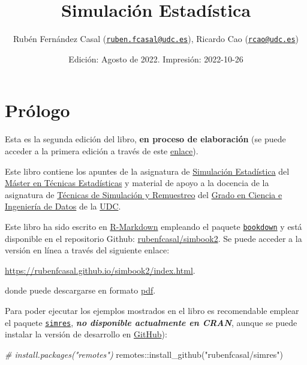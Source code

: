 \documentclass[
]{book}
\title{Simulación Estadística}
\author{Rubén Fernández Casal (\href{mailto:ruben.fcasal@udc.es}{\nolinkurl{ruben.fcasal@udc.es}}), Ricardo Cao (\href{mailto:rcao@udc.es}{\nolinkurl{rcao@udc.es}})}
\date{Edición: Agosto de 2022. Impresión: 2022-10-26}
\newenvironment{Shaded}{\begin{snugshade}}{\end{snugshade}}
\newcommand{\CommentTok}[1]{\textcolor[rgb]{0.56,0.35,0.01}{\textit{#1}}}
\newcommand{\FunctionTok}[1]{\textcolor[rgb]{0.00,0.00,0.00}{#1}}
\newcommand{\NormalTok}[1]{#1}
\newcommand{\SpecialCharTok}[1]{\textcolor[rgb]{0.00,0.00,0.00}{#1}}
\newcommand{\StringTok}[1]{\textcolor[rgb]{0.31,0.60,0.02}{#1}}
\theoremstyle{break}
\theoremstyle{nonumberplain}
\begin{document}
\maketitle

{
\setcounter{tocdepth}{1}
\tableofcontents
}
\hypertarget{pruxf3logo}{%
\chapter*{Prólogo}\label{pruxf3logo}}

Esta es la segunda edición del libro, \textbf{en proceso de elaboración} (se puede acceder a la primera edición a través de este \href{https://rubenfcasal.github.io/simbook/index.html}{enlace}).

Este libro contiene los apuntes de la asignatura de \href{http://eamo.usc.es/pub/mte/index.php/es/?option=com_content\&view=article\&id=2201\&idm=13\&a\%C3\%B1o=2019}{Simulación Estadística} del \href{http://eio.usc.es/pub/mte}{Máster en Técnicas Estadísticas} y material de apoyo a la docencia de la asignatura de \href{https://guiadocente.udc.es/guia_docent/index.php?centre=614\&ensenyament=614G02\&assignatura=614G02036\&idioma=cast}{Técnicas de Simulación y Remuestreo} del \href{https://estudos.udc.es/es/study/start/614G02V01}{Grado en Ciencia e Ingeniería de Datos} de la \href{https://www.udc.es}{UDC}.

Este libro ha sido escrito en \href{http://rmarkdown.rstudio.com}{R-Markdown} empleando el paquete \href{https://bookdown.org/yihui/bookdown/}{\texttt{bookdown}} y está disponible en el repositorio Github: \href{https://github.com/rubenfcasal/simbook2}{rubenfcasal/simbook2}.
Se puede acceder a la versión en línea a través del siguiente enlace:

\url{https://rubenfcasal.github.io/simbook2/index.html}.

donde puede descargarse en formato \href{https://rubenfcasal.github.io/simbook2/Simulacion.pdf}{pdf}.

Para poder ejecutar los ejemplos mostrados en el libro es recomendable emplear el paquete \href{https://rubenfcasal.github.io/simres}{\texttt{simres}}, \textbf{\emph{no disponible actualmente en CRAN}}, aunque se puede instalar la versión de desarrollo en \href{https://github.com/rubenfcasal/simres}{GitHub}):

\begin{Shaded}
\begin{Highlighting}[]
\CommentTok{\# install.packages("remotes")}
\NormalTok{remotes}\SpecialCharTok{::}\FunctionTok{install\_github}\NormalTok{(}\StringTok{"rubenfcasal/simres"}\NormalTok{)}
\end{Highlighting}
\end{Shaded}
\end{document}

